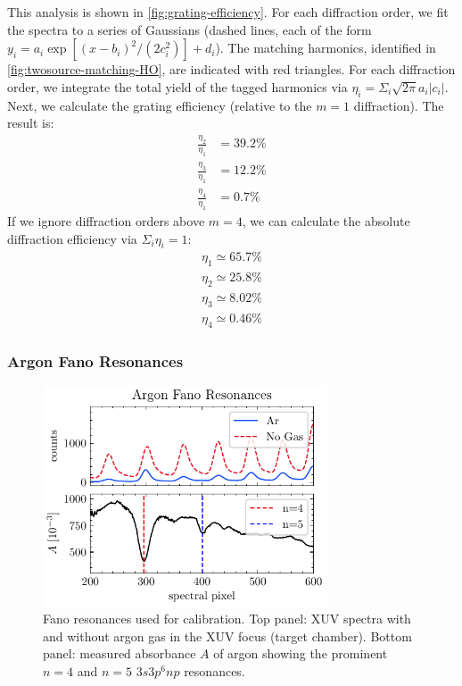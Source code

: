 This analysis is shown in \cref{fig:grating-efficiency}. For each diffraction order, we fit the spectra to a series of Gaussians (dashed lines, each of the form $y_i = a_i \exp \left[ (x-b_i)^2 / (2 c_i^2) \right] + d_i$). The matching harmonics, identified in \cref{fig:twosource-matching-HO}, are indicated with red triangles. For each diffraction order, we integrate the total yield of the tagged harmonics via $\eta_i = \Sigma_i \sqrt{2 \pi} a_i |c_i|$. Next, we calculate the grating efficiency (relative to the $m=1$ diffraction). The result is:
\begin{align*}
\frac{\eta_2}{\eta_1} &= 39.2 \% \\
\frac{\eta_3}{\eta_1} &= 12.2 \% \\
\frac{\eta_4}{\eta_1} &= 0.7 \%
\end{align*}
If we ignore diffraction orders above $m=4$, we can calculate the absolute diffraction efficiency via $\Sigma_i \eta_i = 1$:
\begin{align*}
\eta_1 \simeq  65.7 \% \\
\eta_2 \simeq 25.8 \% \\
\eta_3 \simeq 8.02 \% \\
\eta_4 \simeq 0.46 \%
\end{align*}

\subsubsection{Argon Fano Resonances}

\begin{figure}
	\centering
	\includegraphics[width=0.75\textwidth]{figures/chap2/fano-calibration.pdf}
	\caption{Fano resonances used for calibration. Top panel: XUV spectra with and without argon gas in the XUV focus (target chamber). Bottom panel: measured absorbance $A$ of argon showing the prominent $n=4$ and $n=5$ $3s3p^6np$ resonances.}
	\label{fig:fano-calibration}
\end{figure}

